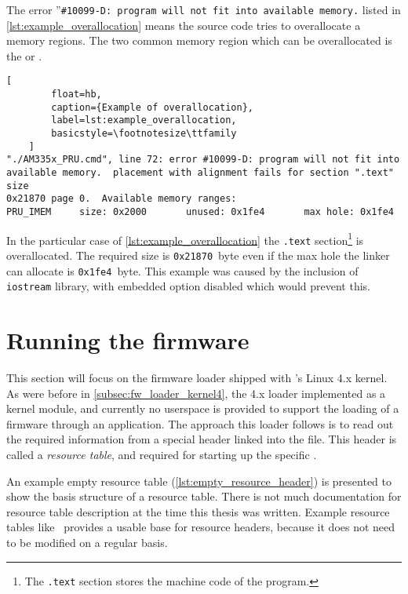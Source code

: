 The error ''\verb|#10099-D: program will not fit into available memory.| listed in \cref{lst:example_overallocation} means the source code tries to overallocate a memory regions. The two common memory region which can be overallocated is the \iram{} or \dram{}.

\begin{lstlisting}[
		float=hb,
		caption={Example of overallocation},
		label=lst:example_overallocation,
		basicstyle=\footnotesize\ttfamily
	]
"./AM335x_PRU.cmd", line 72: error #10099-D: program will not fit into
available memory.  placement with alignment fails for section ".text" size
0x21870 page 0.  Available memory ranges:
PRU_IMEM     size: 0x2000       unused: 0x1fe4       max hole: 0x1fe4
\end{lstlisting}

In the particular case of \cref{lst:example_overallocation} the \verb|.text| section\footnote{The \verb|.text| section stores the machine code of the program.} is overallocated. The required size is \verb|0x21870|\ byte even if the max hole the linker can allocate is \verb|0x1fe4|\ byte. This example was caused by the inclusion of \verb|iostream| library, with embedded \cpp{} option disabled which would prevent this.

\section{Running the firmware}

This section will focus on the firmware loader shipped with \ti{}'s Linux 4.x kernel. As were before in \cref{subsec:fw_loader_kernel4}, the 4.x loader implemented as a kernel module, and currently no userspace \api{} is provided to support the loading of a \pru{} firmware through an application. The approach this loader follows is to read out the required information from a special header linked into the \elf{} file. This header is called a \emph{resource table}, and required for starting up the specific \pru{}.

An example empty resource table (\cref{lst:empty_resource_header}) is presented to show the basis structure of a resource table. There is not much documentation for resource table description at the time this thesis was written. Example resource tables like~\cite{RESOURCE_TABLE_0}\cite{RESOURCE_TABLE_1} provides a usable base for resource headers, because it does not need to be modified on a regular basis.

